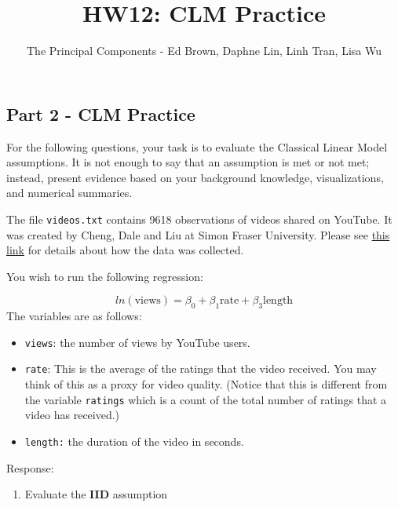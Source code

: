 \documentclass[
]{article}
\title{HW12: CLM Practice}
\author{The Principal Components - Ed Brown, Daphne Lin, Linh Tran, Lisa
Wu}
\date{}
\providecommand{\tightlist}{%
  \setlength{\itemsep}{0pt}\setlength{\parskip}{0pt}}
\begin{document}
\maketitle

\hypertarget{part-2---clm-practice}{%
\subsection{Part 2 - CLM Practice}\label{part-2---clm-practice}}

For the following questions, your task is to evaluate the Classical
Linear Model assumptions. It is not enough to say that an assumption is
met or not met; instead, present evidence based on your background
knowledge, visualizations, and numerical summaries.

The file \texttt{videos.txt} contains 9618 observations of videos shared
on YouTube. It was created by Cheng, Dale and Liu at Simon Fraser
University. Please see \href{http://netsg.cs.sfu.ca/youtubedata/}{this
link} for details about how the data was collected.

You wish to run the following regression:

\[
ln(\text{views}) = \beta_0 + \beta_1 \text{rate}  + \beta_3 \text{length}
\] The variables are as follows:

\begin{itemize}
\tightlist
\item
  \texttt{views}: the number of views by YouTube users.
\item
  \texttt{rate}: This is the average of the ratings that the video
  received. You may think of this as a proxy for video quality. (Notice
  that this is different from the variable \texttt{ratings} which is a
  count of the total number of ratings that a video has received.)
\item
  \texttt{length:} the duration of the video in seconds.
\end{itemize}

Response:

\begin{enumerate}
\def\labelenumi{\arabic{enumi}.}
\tightlist
\item
  Evaluate the \textbf{IID} assumption
\end{enumerate}
\end{document}
